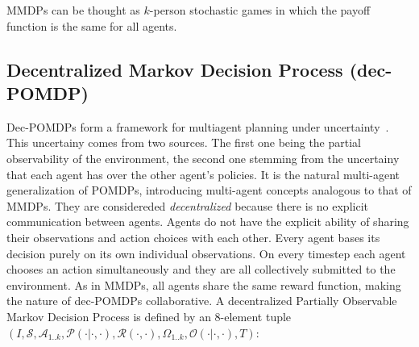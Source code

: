 \documentclass{../main.tex}{}
\begin{document}
MMDPs can be thought as $k$-person stochastic games in which the payoff function is the same for all agents.

\subsection{Decentralized Markov Decision Process (dec-POMDP)}

Dec-POMDPs form a framework for multiagent planning under uncertainty~\citep{Oliehoek2014}. This uncertainy comes from two sources. The first one being the partial observability of the environment, the second one stemming from the uncertainy that each agent has over the other agent's policies. It is the natural multi-agent generalization of POMDPs, introducing multi-agent concepts analogous to that of MMDPs. They are considereded \textit{decentralized} because there is no explicit communication between agents. Agents do not have the explicit ability of sharing their observations and action choices with each other. Every agent bases its decision purely on its own individual observations. On every timestep each agent chooses an action simultaneously and they are all collectively submitted to the environment. As in MMDPs, all agents share the same reward function, making the nature of dec-POMDPs collaborative. A decentralized Partially Observable Markov Decision Process is defined by an 8-element tuple $(I, \mathcal{S}, \mathcal{A}_{1..k}, \mathcal{P}(\cdot | \cdot, \cdot), \mathcal{R}(\cdot, \cdot), \Omega_{1..k}, \mathcal{O(\cdot | \cdot, \cdot)}, T)$:
\end{document}
